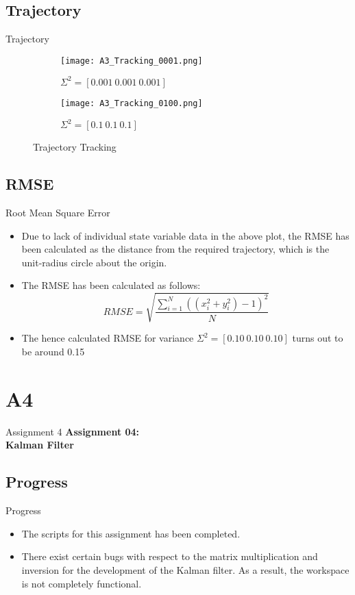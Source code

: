\documentclass{beamer}
\begin{document}
\subsection{Trajectory}
\begin{frame}{Trajectory}
\begin{figure}[H]
    \centering
    \begin{subfigure}{0.45\textwidth}
        \centering
        \texttt{[image: A3\_Tracking\_0001.png]}
        \caption{\(\Sigma^2 = [0.001\ 0.001\ 0.001]\)}
    \end{subfigure}
    \begin{subfigure}{0.45\textwidth}
        \centering
        \texttt{[image: A3\_Tracking\_0100.png]}
        \caption{\(\Sigma^2 = [0.1\ 0.1\ 0.1]\)}
    \end{subfigure}
    \caption{Trajectory Tracking}
\end{figure}
\end{frame}

\subsection{RMSE}
\begin{frame}{Root Mean Square Error}
\begin{itemize}
    \item Due to lack of individual state variable data in the above plot, the RMSE has been calculated as the distance from the required trajectory, which is the unit-radius circle about the origin.
    \item The RMSE has been calculated as follows: \[RMSE = \sqrt{\frac{\sum_{i=1}^N\left((x_i^2+y_i^2)-1\right)^2}{N}}\]
    \item The hence calculated RMSE for variance \(\Sigma^2 = [0.10\ 0.10\ 0.10]\) turns out to be around 0.15
\end{itemize}
\end{frame}

\section{A4}

\begin{frame}{Assignment 4}
  \centering
  \textbf{Assignment 04:\\Kalman Filter}
\end{frame}

\subsection{Progress}
\begin{frame}{Progress}
\begin{itemize}
    \item The scripts for this assignment has been completed.
    \item There exist certain bugs with respect to the matrix multiplication and inversion for the development of the Kalman filter. As a result, the workspace is not completely functional.
\end{itemize}
\end{frame}
\end{document}

